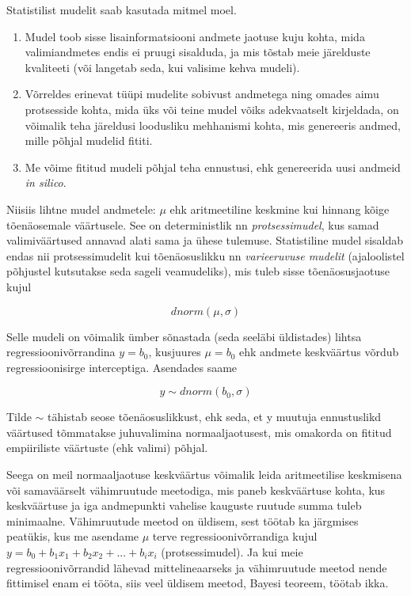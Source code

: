 \documentclass[]{book}
\begin{document}
Statistilist mudelit saab kasutada mitmel moel.

\begin{enumerate}
\def\labelenumi{\arabic{enumi}.}
\item
  Mudel toob sisse lisainformatsiooni andmete jaotuse kuju kohta, mida
  valimiandmetes endis ei pruugi sisalduda, ja mis tõstab meie
  järelduste kvaliteeti (või langetab seda, kui valisime kehva mudeli).
\item
  Võrreldes erinevat tüüpi mudelite sobivust andmetega ning omades aimu
  protsesside kohta, mida üks või teine mudel võiks adekvaatselt
  kirjeldada, on võimalik teha järeldusi loodusliku mehhanismi kohta,
  mis genereeris andmed, mille põhjal mudelid fititi.
\item
  Me võime fititud mudeli põhjal teha ennustusi, ehk genereerida uusi
  andmeid \emph{in silico}.
\end{enumerate}

Niisiis lihtne mudel andmetele: \(\mu\) ehk aritmeetiline keskmine kui
hinnang kõige tõenäosemale väärtusele. See on deterministlik nn
\emph{protsessimudel}, kus samad valimiväärtused annavad alati sama ja
ühese tulemuse. Statistiline mudel sisaldab endas nii protsessimudelit
kui tõenäosuslikku nn \emph{varieeruvuse mudelit} (ajaloolistel
põhjustel kutsutakse seda sageli veamudeliks), mis tuleb sisse
tõenäosusjaotuse kujul

\[dnorm(\mu, \sigma)\]

Selle mudeli on võimalik ümber sõnastada (seda seeläbi üldistades)
lihtsa regressioonivõrrandina \(y = b_0\), kusjuures \(\mu = b_0\) ehk
andmete keskväärtus võrdub regressioonisirge interceptiga. Asendades
saame

\[y \sim dnorm(b_0, \sigma)\]

Tilde \(\sim\) tähistab seose tõenäosuslikkust, ehk seda, et y muutuja
ennustuslikd väärtused tõmmatakse juhuvalimina normaaljaotusest, mis
omakorda on fititud empiiriliste väärtuste (ehk valimi) põhjal.

Seega on meil normaaljaotuse keskväärtus võimalik leida aritmeetilise
keskmisena või samaväärselt vähimruutude meetodiga, mis paneb
keskväärtuse kohta, kus keskväärtuse ja iga andmepunkti vahelise
kauguste ruutude summa tuleb minimaalne. Vähimruutude meetod on üldisem,
sest töötab ka järgmises peatükis, kus me asendame \(\mu\) terve
regressioonivõrrandiga kujul
\(y = b_0 + b_1x_1 + b_2x_2 + ... + b_ix_i\) (protsessimudel). Ja kui
meie regressioonivõrrandid lähevad mittelineaarseks ja vähimruutude
meetod nende fittimisel enam ei tööta, siis veel üldisem meetod, Bayesi
teoreem, töötab ikka.
\end{document}

